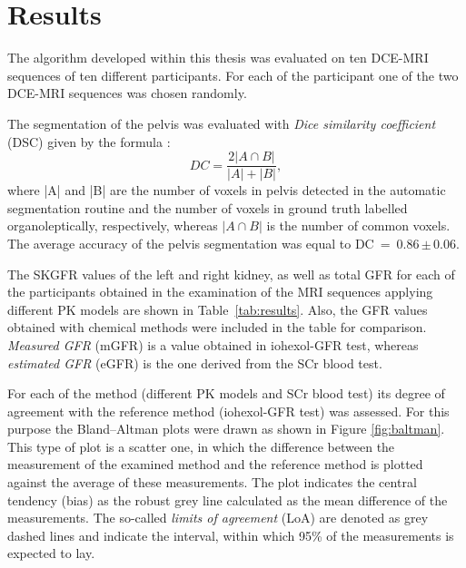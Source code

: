\chapter{Results}
The algorithm developed within this thesis was evaluated on ten DCE-MRI sequences of ten different participants. For each of the participant one of the two  DCE-MRI sequences was chosen randomly.

The segmentation of the pelvis was evaluated with \textit{Dice similarity coefficient} (DSC) given by the formula \cite{dice1945measures}:
\begin{equation}
	\label{eq:dice}
	DC = \dfrac{2|A\cap{}B|}{|A|+|B|},
\end{equation}
where |A| and |B| are the number of voxels in pelvis detected  in the automatic segmentation routine and the number of voxels in ground truth labelled organoleptically, respectively, whereas $|A\cap{}B|$ is the number of common voxels.
The average accuracy of the pelvis segmentation was equal to DC~=~0.86\,$\pm$\,0.06.

The SKGFR values of the left and right kidney, as well as total GFR for each of the participants obtained in the examination of the MRI sequences applying different PK models are shown in Table~\ref{tab:results}. Also, the GFR values obtained with chemical methods were included in the table for comparison. \textit{Measured GFR} (mGFR) is a value obtained in iohexol-GFR test, whereas \textit{estimated GFR} (eGFR) is the one derived from the SCr blood test.

For each of the method (different PK models and SCr blood test) its degree of agreement with the reference method  (iohexol-GFR test) was assessed. For this purpose the Bland–Altman plots \cite{bland1986statistical} were drawn as shown in Figure \ref{fig:baltman}. 
This type of plot is a scatter one, in which the difference between the measurement of the examined method and the reference method is plotted against the average of these measurements.
The plot indicates the central tendency (bias) as the robust grey line calculated as the mean difference of the measurements. The so-called \textit{limits of agreement} (LoA) are denoted as grey dashed lines and indicate the interval, within which 95\% of the measurements is expected to lay.


